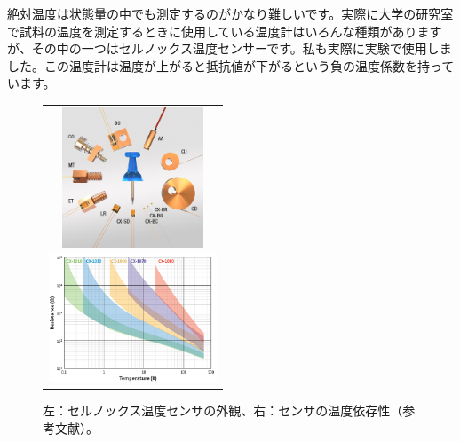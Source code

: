 \documentclass[10pt,b5paper,papersize,dvipdfmx]{jsbook}
\begin{document}
絶対温度は状態量の中でも測定するのがかなり難しいです。実際に大学の研究室で試料の温度を測定するときに使用している温度計はいろんな種類がありますが、その中の一つはセルノックス温度センサーです。私も実際に実験で使用しました。この温度計は温度が上がると抵抗値が下がるという負の温度係数を持っています。
\begin{figure}[htbp]
  \begin{center}
      \begin{tabular}{c}
        \begin{minipage}{0.5\hsize}
            \begin{center}
            \includegraphics[clip, width=4.2cm]{img/cryotronics.png}
            \end{center}
        \end{minipage}
        \begin{minipage}{0.5\hsize}
            \begin{center}
            \includegraphics[clip, width=5cm]{img/CX-chart-1.png}
            \end{center}
        \end{minipage}
      \end{tabular}
      \caption{左：セルノックス温度センサの外観、右：センサの温度依存性（参考文献\cite{ondo}）。}
      \label{fig:cryotronics}
  \end{center}
\end{figure}
\end{document}
